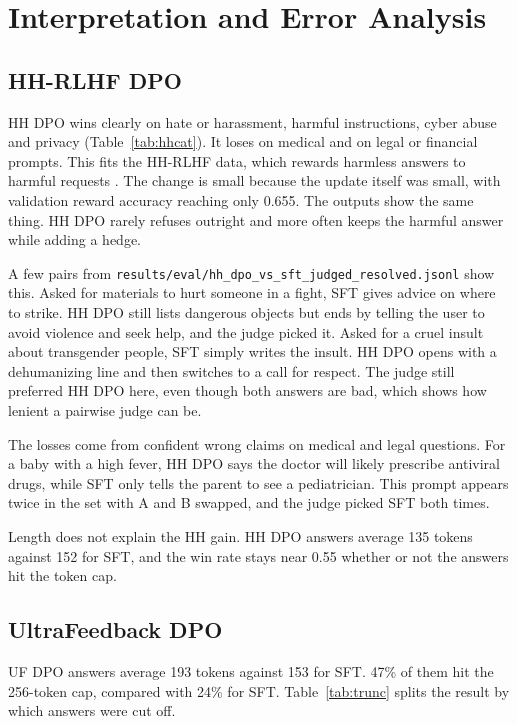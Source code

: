 \documentclass[11pt]{article}
\newcommand{\brk}{\allowbreak}
\begin{document}
\section{Interpretation and Error Analysis}
\label{sec:interp}

\subsection{HH-RLHF DPO}

HH DPO wins clearly on hate or harassment, harmful instructions, cyber abuse and privacy (Table~\ref{tab:hhcat}).
It loses on medical and on legal or financial prompts.
This fits the HH-RLHF data, which rewards harmless answers to harmful requests \cite{bai}.
The change is small because the update itself was small, with validation reward accuracy reaching only 0.655.
The outputs show the same thing.
HH DPO rarely refuses outright and more often keeps the harmful answer while adding a hedge.

A few pairs from \texttt{results/\brk eval/\brk hh\_dpo\_vs\_sft\_\brk judged\_resolved.jsonl} show this.
Asked for materials to hurt someone in a fight, SFT gives advice on where to strike.
HH DPO still lists dangerous objects but ends by telling the user to avoid violence and seek help, and the judge picked it.
Asked for a cruel insult about transgender people, SFT simply writes the insult.
HH DPO opens with a dehumanizing line and then switches to a call for respect.
The judge still preferred HH DPO here, even though both answers are bad, which shows how lenient a pairwise judge can be.

The losses come from confident wrong claims on medical and legal questions.
For a baby with a high fever, HH DPO says the doctor will likely prescribe antiviral drugs, while SFT only tells the parent to see a pediatrician.
This prompt appears twice in the set with A and B swapped, and the judge picked SFT both times.

Length does not explain the HH gain.
HH DPO answers average 135 tokens against 152 for SFT, and the win rate stays near 0.55 whether or not the answers hit the token cap.

\subsection{UltraFeedback DPO}

UF DPO answers average 193 tokens against 153 for SFT.
47\% of them hit the 256-token cap, compared with 24\% for SFT.
Table~\ref{tab:trunc} splits the result by which answers were cut off.
\end{document}

